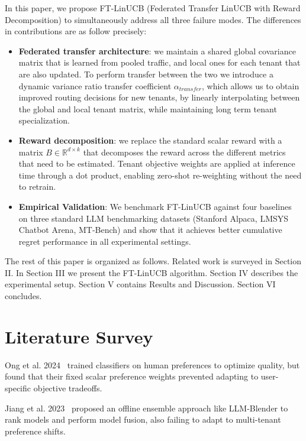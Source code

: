 \documentclass[conference]{IEEEtran}
\begin{document}
In this paper, we propose FT-LinUCB (Federated Transfer LinUCB with Reward Decomposition) to simultaneously address all three failure modes. The differences in contributions are as follow precisely:

\begin{itemize}
  \item \textbf{Federated transfer architecture}: we maintain a shared global covariance matrix that is learned from pooled traffic, and local ones for each tenant that are also updated. To perform transfer between the two we introduce a dynamic variance ratio transfer coefficient $\alpha_{transfer}$, which allows us to obtain improved routing decisions for new tenants, by linearly interpolating between the global and local tenant matrix, while maintaining long term tenant specialization.
  \item \textbf{Reward decomposition}: we replace the standard scalar reward with a matrix $B \in \mathbb{R}^{d \times k}$ that decomposes the reward across the different metrics that need to be estimated. Tenant objective weights are applied at inference time through a dot product, enabling zero-shot re-weighting without the need to retrain.
  \item \textbf{Empirical Validation}: We benchmark FT-LinUCB against four baselines on three standard LLM benchmarking datasets (Stanford Alpaca, LMSYS Chatbot Arena, MT-Bench) and show that it achieves better cumulative regret performance in all experimental settings.
\end{itemize}

The rest of this paper is organized as follows. Related work is surveyed in Section II. In Section III we present the FT-LinUCB algorithm. Section IV describes the experimental setup. Section V contains Results and Discussion. Section VI concludes.


\section{Literature Survey}

Ong et al. 2024~\cite{ong2024routellm} trained classifiers on human preferences to optimize quality, but found that their fixed scalar preference weights prevented adapting to user-specific objective tradeoffs.

Jiang et al. 2023~\cite{jiang2023llmblender} proposed an offline ensemble approach like LLM-Blender to rank models and perform model fusion, also failing to adapt to multi-tenant preference shifts.
\end{document}
